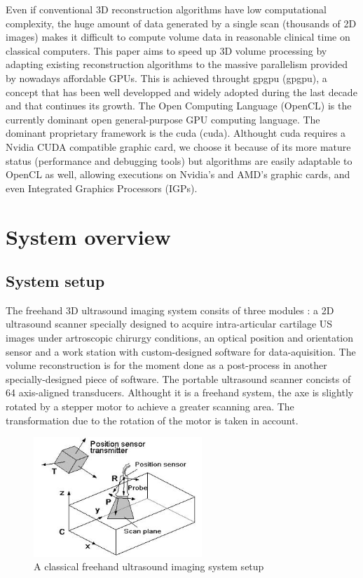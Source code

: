 \documentclass[12pt,journal,compsoc]{IEEEtran}
\begin{document}
Even if conventional 3D reconstruction algorithms have low computational complexity, the huge amount of data generated by a single scan (thousands of 2D images) makes it difficult to compute volume data in reasonable clinical time on classical computers.
This paper aims to speed up 3D volume processing by adapting existing reconstruction algorithms to the massive parallelism provided by nowadays affordable GPUs. This is achieved throught \acl{gpgpu} (\ac{gpgpu}), a concept that has been well developped and widely adopted during the last decade and that continues its growth.
The Open Computing Language (OpenCL) is the currently dominant open general-purpose GPU computing language. The dominant proprietary framework is the \acl{cuda} (\ac{cuda}).
Althought \ac{cuda} requires a Nvidia CUDA compatible graphic card, we choose it because of its more mature status (performance and debugging tools) but algorithms are easily adaptable to OpenCL as well, allowing executions on Nvidia's and AMD's graphic cards, and even Integrated Graphics Processors (IGPs).

\section{System overview}

\subsection{System setup}

The freehand 3D ultrasound imaging system consits of three modules : a 2D ultrasound scanner specially designed to acquire intra-articular cartilage US images under artroscopic chirurgy conditions, an optical position and orientation sensor and a work station with custom-designed software for data-aquisition. The volume reconstruction is for the moment done as a post-process in another specially-designed piece of software.
The portable ultrasound scanner concists of 64 axis-aligned transducers. Althought it is a freehand system, the axe is slightly rotated by a stepper motor to achieve a greater scanning area. The transformation due to the rotation of the motor is taken in account.

\begin{figure}[!h]
\centering
\includegraphics[width=2.5in]{freehand}
\caption{A classical freehand ultrasound imaging system setup}
\label{fig_1}
\end{figure}
\end{document}
